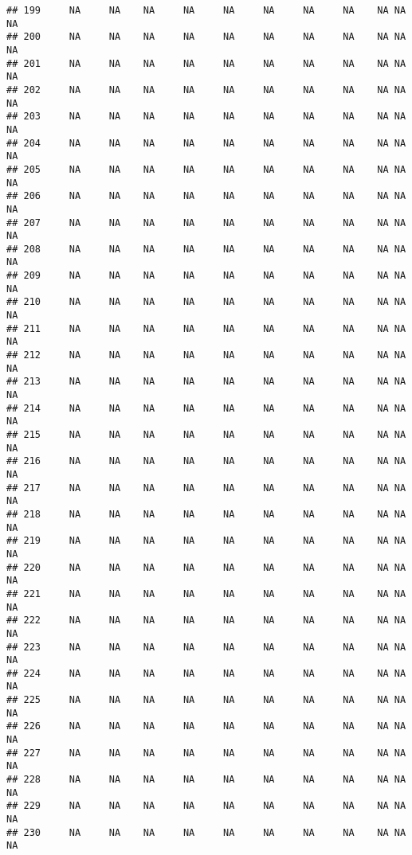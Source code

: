\documentclass[]{article}
\begin{document}
\begin{verbatim}
## 199     NA     NA    NA     NA     NA     NA     NA     NA    NA NA          NA
## 200     NA     NA    NA     NA     NA     NA     NA     NA    NA NA          NA
## 201     NA     NA    NA     NA     NA     NA     NA     NA    NA NA          NA
## 202     NA     NA    NA     NA     NA     NA     NA     NA    NA NA          NA
## 203     NA     NA    NA     NA     NA     NA     NA     NA    NA NA          NA
## 204     NA     NA    NA     NA     NA     NA     NA     NA    NA NA          NA
## 205     NA     NA    NA     NA     NA     NA     NA     NA    NA NA          NA
## 206     NA     NA    NA     NA     NA     NA     NA     NA    NA NA          NA
## 207     NA     NA    NA     NA     NA     NA     NA     NA    NA NA          NA
## 208     NA     NA    NA     NA     NA     NA     NA     NA    NA NA          NA
## 209     NA     NA    NA     NA     NA     NA     NA     NA    NA NA          NA
## 210     NA     NA    NA     NA     NA     NA     NA     NA    NA NA          NA
## 211     NA     NA    NA     NA     NA     NA     NA     NA    NA NA          NA
## 212     NA     NA    NA     NA     NA     NA     NA     NA    NA NA          NA
## 213     NA     NA    NA     NA     NA     NA     NA     NA    NA NA          NA
## 214     NA     NA    NA     NA     NA     NA     NA     NA    NA NA          NA
## 215     NA     NA    NA     NA     NA     NA     NA     NA    NA NA          NA
## 216     NA     NA    NA     NA     NA     NA     NA     NA    NA NA          NA
## 217     NA     NA    NA     NA     NA     NA     NA     NA    NA NA          NA
## 218     NA     NA    NA     NA     NA     NA     NA     NA    NA NA          NA
## 219     NA     NA    NA     NA     NA     NA     NA     NA    NA NA          NA
## 220     NA     NA    NA     NA     NA     NA     NA     NA    NA NA          NA
## 221     NA     NA    NA     NA     NA     NA     NA     NA    NA NA          NA
## 222     NA     NA    NA     NA     NA     NA     NA     NA    NA NA          NA
## 223     NA     NA    NA     NA     NA     NA     NA     NA    NA NA          NA
## 224     NA     NA    NA     NA     NA     NA     NA     NA    NA NA          NA
## 225     NA     NA    NA     NA     NA     NA     NA     NA    NA NA          NA
## 226     NA     NA    NA     NA     NA     NA     NA     NA    NA NA          NA
## 227     NA     NA    NA     NA     NA     NA     NA     NA    NA NA          NA
## 228     NA     NA    NA     NA     NA     NA     NA     NA    NA NA          NA
## 229     NA     NA    NA     NA     NA     NA     NA     NA    NA NA          NA
## 230     NA     NA    NA     NA     NA     NA     NA     NA    NA NA          NA

\end{verbatim}
\end{document}
